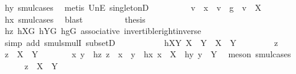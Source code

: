 \begin{isabellebody}
\ hy\ smul{\isachardot}{\kern0pt}cases\ \isamarkupfalse%
\ {\isacharparenleft}{\kern0pt}metis\ UnE\ singletonD{\isacharparenright}{\kern0pt}\isanewline
\ \ \ \ \ \ \isamarkupfalse%
\ \isamarkupfalse%
\ v\ \ {\isachardoublequoteopen}x\ {\isacharequal}{\kern0pt}\ v\ {\isasymcdot}\ g{\isachardoublequoteclose}\ \ {\isachardoublequoteopen}v\ {\isasymin}\ X{\isachardoublequoteclose}\ \isamarkupfalse%
\ hx\ smul{\isachardot}{\kern0pt}cases\ \isamarkupfalse%
\ blast\isanewline
\ \ \ \ \ \ \isamarkupfalse%
\ \isamarkupfalse%
\ {\isacharquery}{\kern0pt}thesis\ \isamarkupfalse%
\ hz\ hXG\ hYG\ hgG\ associative\ invertible{\isacharunderscore}{\kern0pt}right{\isacharunderscore}{\kern0pt}inverse{}\isanewline
\ \ \ \ \ \ \ \ \isamarkupfalse%
\ {\isacharparenleft}{\kern0pt}simp\ add{\isacharcolon}{\kern0pt}\ smul{\isachardot}{\kern0pt}smulI\ subsetD{\isacharparenright}{\kern0pt}\isanewline
\ \ \ \ \isamarkupfalse%
\isanewline
\ \ \isamarkupfalse%
\isanewline
\ \ \isamarkupfalse%
\ hXY{}{\isacharcolon}{\kern0pt}\ {\isachardoublequoteopen}{\isacharquery}{\kern0pt}X{}\ {\isasymcdots}\ {\isacharquery}{\kern0pt}Y{}\ {\isasymsubseteq}\ X\ {\isasymcdots}\ Y{\isachardoublequoteclose}\isanewline
\ \ \isamarkupfalse%
\isanewline
\ \ \ \ \isamarkupfalse%
\ z\ \isamarkupfalse%
\ {\isachardoublequoteopen}z\ {\isasymin}\ {\isacharquery}{\kern0pt}X{}\ {\isasymcdots}\ {\isacharquery}{\kern0pt}Y{}{\isachardoublequoteclose}\isanewline
\ \ \ \ \isamarkupfalse%
\ \isamarkupfalse%
\ x\ y\ \ hz{\isacharcolon}{\kern0pt}\ {\isachardoublequoteopen}z\ {\isacharequal}{\kern0pt}\ x\ {\isasymcdot}\ y{\isachardoublequoteclose}\ \ hx{\isacharcolon}{\kern0pt}\ {\isachardoublequoteopen}x\ {\isasymin}\ {\isacharquery}{\kern0pt}X{}{\isachardoublequoteclose}\ \ hy{\isacharcolon}{\kern0pt}\ {\isachardoublequoteopen}y\ {\isasymin}\ {\isacharquery}{\kern0pt}Y{}{\isachardoublequoteclose}\ \isamarkupfalse%
\ {\isacharparenleft}{\kern0pt}meson\ smul{\isachardot}{\kern0pt}cases{\isacharparenright}{\kern0pt}\isanewline
\ \ \ \ \isamarkupfalse%
\ {\isachardoublequoteopen}z\ {\isasymin}\ X\ {\isasymcdots}\ Y{\isachardoublequoteclose}\isanewline

\end{isabellebody}
